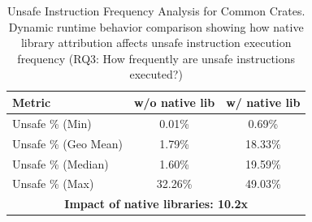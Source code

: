 \begin{table}[tb]
\caption{Unsafe Instruction Frequency Analysis for Common Crates.
Dynamic runtime behavior comparison showing how native library attribution affects
unsafe instruction execution frequency (RQ3: How frequently are unsafe instructions executed?)}
\label{table:unsafe_inst_frequency}
\centering
\begin{tabular}{@{}l|c|c@{}}
\toprule
\textbf{Metric} & \textbf{w/o native lib} & \textbf{w/ native lib} \\
\midrule
Unsafe \% (Min) & 0.01\% & 0.69\% \\
Unsafe \% (Geo Mean) & 1.79\% & 18.33\% \\
Unsafe \% (Median) & 1.60\% & 19.59\% \\
Unsafe \% (Max) & 32.26\% & 49.03\% \\
\midrule
\multicolumn{3}{c}{\textbf{Impact of native libraries: 10.2x}} \\
\bottomrule
\end{tabular}
\end{table}
